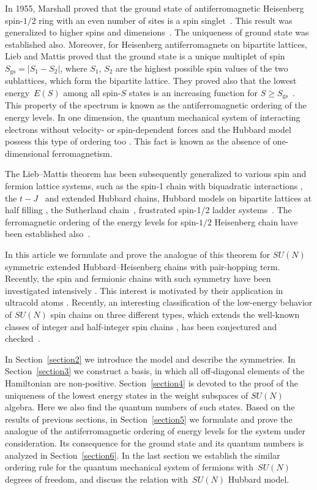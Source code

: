 \documentclass[pdftex]{sigma}
\begin{document}
In 1955, Marshall proved that the ground state of
antiferromagnetic Heisenberg spin-$1/2$ ring with an even number of
sites  is a spin singlet~\cite{M55}. This result
was generalized to higher spins and dimensions~\cite{LSM61}. The
uniqueness of ground state was established also. Moreover, for
Heisenberg antiferromagnets on bipartite lattices, Lieb and Mattis
proved that the ground state is a unique multiplet of spin
$S_\text{gs}=|S_1-S_2|$, where $S_1$, $S_2$
are the highest possible spin values of the two sublattices, which form
the bipartite lattice. They proved also that the lowest energy~$E(S)$ among all spin-$S$ states is an increasing function for
$S\ge S_\text{gs}$~\cite{LM62,Lieb89}. This property of the spectrum is known as
the antiferromagnetic ordering of the energy levels.
In one dimension, the  quantum mechanical system of interacting  electrons
without velocity- or spin-dependent forces
and the Hubbard model  possess this type of ordering  too \cite{LM62'}.
This fact is known as the absence of one-dimensional ferromagnetism.

The Lieb--Mattis theorem has been subsequently generalized to various spin
and fermion lattice systems, such as the spin-1 chain with
biquadratic interactions \cite{murno76}, the $t-J$~\cite{Amb92-1} and
extended Hubbard \cite{Amb92-2} chains, Hubbard models on bipartite
lattices at half f\/illing \cite{Shen98}, the Sutherland chain~\cite{H04},
frustrated spin-1/2 ladder systems~\cite{H07}. The ferromagnetic
ordering of the energy levels for spin-$1/2$ Heisenberg chain have
been established also~\cite{Nach03}.

In this article we formulate and prove the analogue of this theorem
for $SU(N)$ symmetric extended Hubbard--Heisenberg chains with pair-hopping
term.
Recently, the spin and fermionic chains with such symmetry
have been investigated intensively \cite{H04,Greiter07,Rachel09,Aguado09}.
This interest is motivated by their application in ultracold  atoms
\cite{Honercamp04,Gorshkov09}.
Recently, an interesting classif\/ication of the low-energy behavior of $SU(N)$
spin chains on three dif\/ferent types, which extends the well-known
classes of integer and half-integer spin chains \cite{Haldane83},
has been  conjectured and checked~\mbox{\cite{Greiter07,Rachel09}}.

In Section~\ref{section2} we introduce the model and describe the symmetries.
In Section~\ref{section3} we construct a basis, in which all of\/f-diagonal elements
of the Hamiltonian are non-positive. Section~\ref{section4} is devoted to the proof
of the uniqueness of the lowest energy states in the weight subspaces of $SU(N)$ algebra.
Here we also f\/ind the quantum numbers of such states.
Based on the results of previous sections, in Section~\ref{section5} we formulate and prove the analogue
of the antiferromagnetic ordering of energy levels for the  system under
consideration.  Its consequence for the ground state and its quantum numbers is analyzed in
Section~\ref{section6}. In the last section we establish the similar  ordering rule for the quantum
mechanical system of fermions with~$SU(N)$
degrees of freedom, and discuss the relation with~$SU(N)$ Hubbard model.
\end{document}

